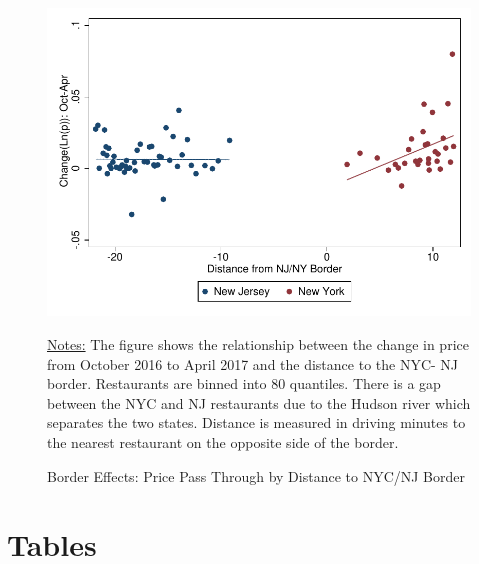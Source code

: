 \documentclass[11pt]{article}
\begin{document}
\begin{figure}[H]
\centering
\caption{Border Effects:  Price Pass Through by Distance to NYC/NJ Border}
\includegraphics[scale=.75]{gh_dist.pdf}

{\footnotesize \raggedright \underline{Notes:} The figure shows the relationship between the change in price from October 2016 to April 2017 and the distance to the NYC- NJ border. Restaurants are binned into 80 quantiles. There is a gap between the NYC and NJ restaurants due to the Hudson river which separates the two states. Distance is measured in driving minutes to the nearest restaurant on the opposite side of the border. \par }

\end{figure}
%


\newpage 

\section{Tables}
\end{document}
